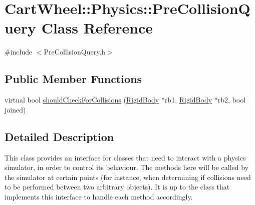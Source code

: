\hypertarget{classCartWheel_1_1Physics_1_1PreCollisionQuery}{
\section{CartWheel::Physics::PreCollisionQuery Class Reference}
\label{classCartWheel_1_1Physics_1_1PreCollisionQuery}
}


{\ttfamily \#include $<$PreCollisionQuery.h$>$}

\subsection*{Public Member Functions}
\begin{DoxyCompactItemize}
\item 
virtual bool \hyperlink{classCartWheel_1_1Physics_1_1PreCollisionQuery_ab0d4931b667c1d88967e16288c9d53bf}{shouldCheckForCollisions} (\hyperlink{classCartWheel_1_1Physics_1_1RigidBody}{RigidBody} $\ast$rb1, \hyperlink{classCartWheel_1_1Physics_1_1RigidBody}{RigidBody} $\ast$rb2, bool joined)
\end{DoxyCompactItemize}


\subsection{Detailed Description}
This class provides an interface for classes that need to interact with a physics simulator, in order to control its behaviour. The methods here will be called by the simulator at certain points (for instance, when determining if collisions need to be performed between two arbitrary objects). It is up to the class that implements this interface to handle each method accordingly. 

